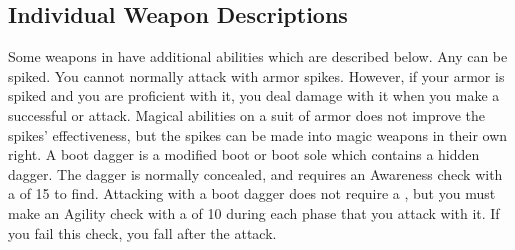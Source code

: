     \subsection{Individual Weapon Descriptions}
        Some weapons in  have additional abilities which are described below.
         Any  can be spiked.
        You cannot normally attack with armor spikes.
        However, if your armor is spiked and you are proficient with it, you deal damage with it when you make a successful  or  attack.
        Magical abilities on a suit of armor does not improve the spikes' effectiveness, but the spikes can be made into magic weapons in their own right.
         A boot dagger is a modified boot or boot sole which contains a hidden dagger.
        The dagger is normally concealed, and requires an Awareness check with a  of 15 to find.
        Attacking with a boot dagger does not require a , but you must make an Agility check with a  of 10 during each phase that you attack with it.
        If you fail this check, you fall  after the attack.

